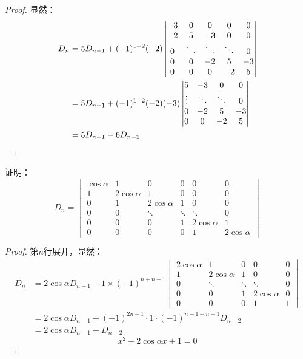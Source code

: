 \begin{proof}
	显然：
	\begin{align*}
		D_n&=5D_{n-1}+(-1)^{1+2}(-2)
		\begin{vmatrix}
			-3 & 0 & 0 & 0 & 0 \\
			-2 & 5 & -3 & 0 & 0 \\
			0 & \ddots & \ddots & \ddots & 0 \\
			0 & 0 & -2 & 5 & -3 \\
			0 & 0 & 0 & -2 & 5
		\end{vmatrix} \\
		&=5D_{n-1}+(-1)^{1+2}(-2)(-3)
		\begin{vmatrix}
			5 & -3 & 0 & 0 \\
			\vdots & \ddots & \ddots & 0 \\
			0 & -2 & 5 & -3 \\
			0 & 0 & -2 & 5
		\end{vmatrix} \\
		&=5D_{n-1}-6D_{n-2}\qedhere
	\end{align*}
\end{proof}
\begin{theorem}
	证明：
	\begin{equation*}
		D_n=
		\begin{vmatrix}
			\cos\alpha & 1 & 0 & 0 & 0 & 0 \\
			1 & 2\cos\alpha & 1 & 0 & 0 & 0 \\
			0 & 1 & 2\cos\alpha & 1 & 0 & 0 \\
			0 & 0 & \ddots & \ddots & \ddots & 0 \\
			0 & 0 & 0 & 1 & 2\cos\alpha & 1 \\
			0 & 0 & 0 & 0 & 1 & 2\cos\alpha
		\end{vmatrix}
	\end{equation*}
\end{theorem}
\begin{proof}
	第$n$行展开，显然：
	\begin{align*}
		D_n&=2\cos\alpha D_{n-1}+1\times(-1)^{n+n-1}
		\begin{vmatrix}
			2\cos\alpha & 1 & 0 & 0 & 0 \\
			1 & 2\cos\alpha & 1 & 0 & 0 \\
			0 & \ddots & \ddots & \ddots & 0 \\
			0 & 0 & 1 & 2\cos\alpha & 0 \\
			0 & 0 & 0 & 1 & 1
		\end{vmatrix}
		\\
		&=2\cos\alpha D_{n-1}+(-1)^{2n-1}\cdot 1\cdot(-1)^{n-1+n-1}D_{n-2} \\
		&=2\cos\alpha D_{n-1}-D_{n-2}
	\end{align*}
	\begin{equation*}
		x^2-2\cos\alpha x+1=0
	\end{equation*}
\end{proof}


